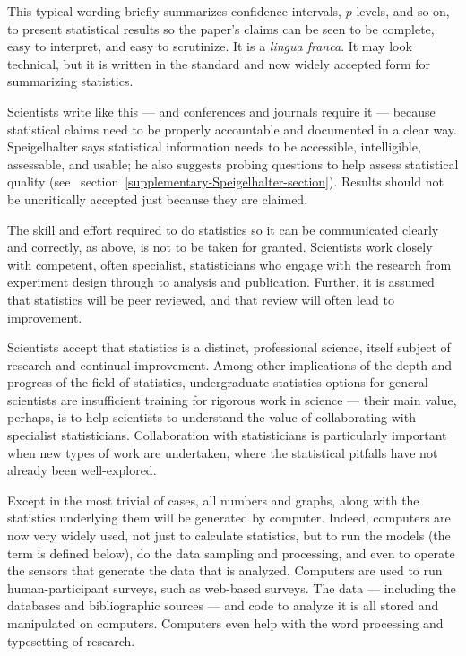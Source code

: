 This typical wording briefly summarizes confidence intervals, $p$ levels, and so on, to present statistical results so the paper's claims can be seen to be complete, easy to interpret, and easy to scrutinize. It is a \emph{lingua franca}. It may look technical, but it is written in the standard and now widely accepted form for summarizing statistics. 

Scientists write like this --- and conferences and journals require it --- because statistical claims need to be properly accountable and documented in a clear way. Speigelhalter \cite{Speigelhalter} says statistical information needs to be accessible, intelligible, assessable, and usable; he also suggests probing questions to help assess statistical quality (see \supplement\ section~\ref{supplementary-Speigelhalter-section}). Results should not be uncritically accepted just because they are claimed.

The skill and effort required to do statistics so it can be communicated clearly and correctly, as above, is not to be taken for granted. Scientists work closely with competent, often specialist, statisticians who engage with the research from experiment design through to analysis and publication. Further, it is assumed that statistics will be peer reviewed, and that review will often lead to improvement. 

Scientists accept that statistics is a distinct, professional science, itself subject of research and continual improvement. Among other implications of the depth and progress of the field of statistics, undergraduate statistics options for general scientists are insufficient training for rigorous work in science --- their main value, perhaps, is to help scientists to understand the value of collaborating with specialist statisticians. Collaboration with statisticians is particularly important when new types of work are undertaken, where the statistical pitfalls have not already been well-explored.

Except in the most trivial of cases, all numbers and graphs, along with the statistics underlying them will be generated by computer. Indeed, computers are now very widely used, not just to calculate statistics, but to run the models (the term is defined below), do the data sampling and processing, and even to operate the sensors that generate the data that is analyzed. Computers are used to run human-participant surveys, such as web-based surveys. The data --- including the databases and bibliographic sources --- and code to analyze it is all stored and manipulated on computers. Computers even help with the word processing and typesetting of research.

